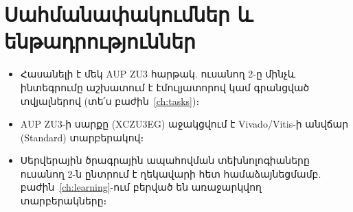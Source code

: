 \section{Սահմանափակումներ և ենթադրություններ}
\begin{itemize}
  \item Հասանելի է մեկ AUP ZU3 հարթակ. ուսանող 2-ը մինչև ինտեգրումը աշխատում է էմուլյատորով կամ գրանցված տվյալներով (տե՛ս բաժին~\ref{ch:tasks})։
  \item AUP ZU3-ի սարքը (XCZU3EG) աջակցվում է Vivado/Vitis-ի անվճար (Standard) տարբերակով։
  \item Սերվերային ծրագրային ապահովման տեխնոլոգիաները ուսանող 2-ն ընտրում է ղեկավարի հետ համաձայնեցմամբ. բաժին~\ref{ch:learning}-ում բերված են առաջարկվող տարբերակները։
\end{itemize}
